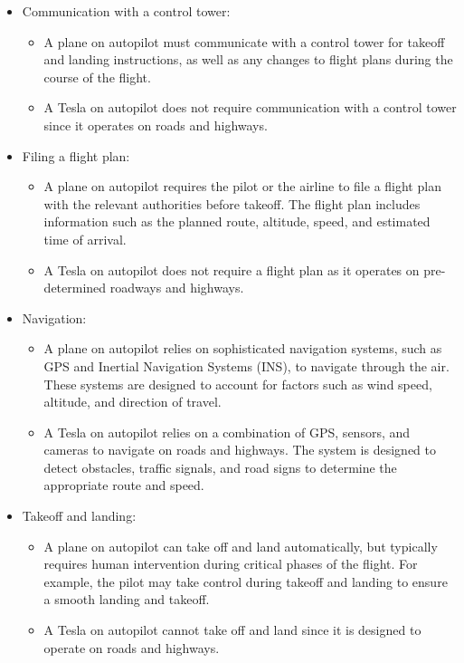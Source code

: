 \begin{itemize}
    \item Communication with a control tower:
    \begin{itemize}
        \item A plane on autopilot must communicate with a control tower for takeoff and landing instructions, as well as any changes to flight plans during the course of the flight.
        \item A Tesla on autopilot does not require communication with a control tower since it operates on roads and highways.
    \end{itemize}
\item Filing a flight plan: 
    \begin{itemize}
        \item A plane on autopilot requires the pilot or the airline to file a flight plan with the relevant authorities before takeoff. The flight plan includes information such as the planned route, altitude, speed, and estimated time of arrival.
        \item A Tesla on autopilot does not require a flight plan as it operates on pre-determined roadways and highways. 
    \end{itemize}

\item Navigation: 
    \begin{itemize}
        \item A plane on autopilot relies on sophisticated navigation systems, such as GPS and Inertial Navigation Systems (INS), to navigate through the air. These systems are designed to account for factors such as wind speed, altitude, and direction of travel.
        \item A Tesla on autopilot relies on a combination of GPS, sensors, and cameras to navigate on roads and highways. The system is designed to detect obstacles, traffic signals, and road signs to determine the appropriate route and speed.
    \end{itemize}

\item Takeoff and landing: 
    \begin{itemize}
        \item A plane on autopilot can take off and land automatically, but typically requires human intervention during critical phases of the flight. For example, the pilot may take control during takeoff and landing to ensure a smooth landing and takeoff.
        \item A Tesla on autopilot cannot take off and land since it is designed to operate on roads and highways.
    \end{itemize}


\end{itemize}
